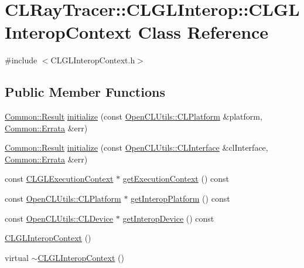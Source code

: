 \hypertarget{class_c_l_ray_tracer_1_1_c_l_g_l_interop_1_1_c_l_g_l_interop_context}{}\section{C\+L\+Ray\+Tracer\+:\+:C\+L\+G\+L\+Interop\+:\+:C\+L\+G\+L\+Interop\+Context Class Reference}
\label{class_c_l_ray_tracer_1_1_c_l_g_l_interop_1_1_c_l_g_l_interop_context}


{\ttfamily \#include $<$C\+L\+G\+L\+Interop\+Context.\+h$>$}

\subsection*{Public Member Functions}
\begin{DoxyCompactItemize}
\item 
\hyperlink{_errata_8h_a389396702f1aff6e71eb21328b0775c1}{Common\+::\+Result} \hyperlink{class_c_l_ray_tracer_1_1_c_l_g_l_interop_1_1_c_l_g_l_interop_context_a4f391524b83a921d711403ee443a11a7}{initialize} (const \hyperlink{class_c_l_ray_tracer_1_1_open_c_l_utils_1_1_c_l_platform}{Open\+C\+L\+Utils\+::\+C\+L\+Platform} \&platform, \hyperlink{class_c_l_ray_tracer_1_1_common_1_1_errata}{Common\+::\+Errata} \&err)
\item 
\hyperlink{_errata_8h_a389396702f1aff6e71eb21328b0775c1}{Common\+::\+Result} \hyperlink{class_c_l_ray_tracer_1_1_c_l_g_l_interop_1_1_c_l_g_l_interop_context_a1e08d7458413f12c8a7547813c8b1b82}{initialize} (const \hyperlink{class_c_l_ray_tracer_1_1_open_c_l_utils_1_1_c_l_interface}{Open\+C\+L\+Utils\+::\+C\+L\+Interface} \&cl\+Interface, \hyperlink{class_c_l_ray_tracer_1_1_common_1_1_errata}{Common\+::\+Errata} \&err)
\item 
const \hyperlink{class_c_l_ray_tracer_1_1_c_l_g_l_interop_1_1_c_l_g_l_execution_context}{C\+L\+G\+L\+Execution\+Context} $\ast$ \hyperlink{class_c_l_ray_tracer_1_1_c_l_g_l_interop_1_1_c_l_g_l_interop_context_a025373c5027d96fa8024c2fc3e1a7eea}{get\+Execution\+Context} () const 
\item 
const \hyperlink{class_c_l_ray_tracer_1_1_open_c_l_utils_1_1_c_l_platform}{Open\+C\+L\+Utils\+::\+C\+L\+Platform} $\ast$ \hyperlink{class_c_l_ray_tracer_1_1_c_l_g_l_interop_1_1_c_l_g_l_interop_context_a978b5f6a69cfbc54991c1b71db66e6b3}{get\+Interop\+Platform} () const 
\item 
const \hyperlink{class_c_l_ray_tracer_1_1_open_c_l_utils_1_1_c_l_device}{Open\+C\+L\+Utils\+::\+C\+L\+Device} $\ast$ \hyperlink{class_c_l_ray_tracer_1_1_c_l_g_l_interop_1_1_c_l_g_l_interop_context_aa62034aeda5335d2fc1933186457d408}{get\+Interop\+Device} () const 
\item 
\hyperlink{class_c_l_ray_tracer_1_1_c_l_g_l_interop_1_1_c_l_g_l_interop_context_a836720a22d2c13a846d18cbde819f5e9}{C\+L\+G\+L\+Interop\+Context} ()
\item 
virtual \hyperlink{class_c_l_ray_tracer_1_1_c_l_g_l_interop_1_1_c_l_g_l_interop_context_a2be07d7835bbad957b12145d49b8afcc}{$\sim$\+C\+L\+G\+L\+Interop\+Context} ()
\end{DoxyCompactItemize}


